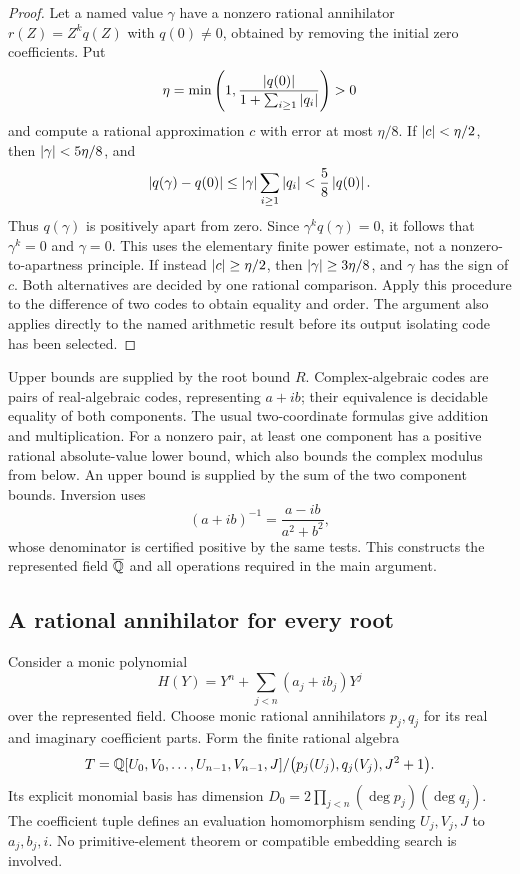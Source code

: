 \begin{proof}
Let a named value $\gamma$ have a nonzero rational annihilator
$r(Z)=Z^k q(Z)$ with $q(0)\ne0$, obtained by removing the initial zero
coefficients. Put
\[
 \eta=\min\left(1,
       \frac{\left|q(0)\right|}{1+\sum_{i\ge1}\left|q_i\right|}\right)>0
\]
and compute a rational approximation $c$ with error at most $\eta/8$.
If $\left|c\right|<\eta/2$, then $\left|\gamma\right|<5\eta/8$, and
\[
 \left|q(\gamma)-q(0)\right|
 \le\left|\gamma\right|\sum_{i\ge1}\left|q_i\right|
 <\frac58\left|q(0)\right|.
\]
Thus $q(\gamma)$ is positively apart from zero. Since
$\gamma^k q(\gamma)=0$, it follows that $\gamma^k=0$ and $\gamma=0$.
This uses the elementary finite power estimate, not a
nonzero-to-apartness principle. If instead $\left|c\right|\ge\eta/2$, then
$\left|\gamma\right|\ge3\eta/8$, and $\gamma$ has the sign of $c$.
Both alternatives are decided by one rational comparison.
Apply this procedure to the difference of two codes to obtain equality
and order. The argument also applies directly to the named arithmetic
result before its output isolating code has been selected.
\end{proof}

Upper bounds are supplied by the root bound $R$.
Complex-algebraic codes are pairs of real-algebraic codes, representing
$a+ib$; their equivalence is decidable equality of both components.
The usual two-coordinate formulas give addition and multiplication.
For a nonzero pair, at least one component has a positive rational
absolute-value lower bound, which also bounds the complex modulus from
below. An upper bound is supplied by the sum of the two component bounds.
Inversion uses
\[
 (a+ib)^{-1}=\frac{a-ib}{a^2+b^2},
\]
whose denominator is certified positive by the same tests.
This constructs the represented field $\overline{\mathbb Q}$ and all operations required
in the main argument.

\subsection{A rational annihilator for every root}

Consider a monic polynomial
\[
 H(Y)=Y^n+\sum_{j<n}(a_j+ib_j)Y^j
\]
over the represented field. Choose monic rational annihilators $p_j,q_j$
for its real and imaginary coefficient parts. Form the finite rational
algebra
\[
 T=\mathbb Q[U_0,V_0,\ldots,U_{n-1},V_{n-1},J]/
       \bigl(p_j(U_j),q_j(V_j),J^2+1\bigr).
\]
Its explicit monomial basis has dimension
$D_0=2\prod_{j<n}(\deg p_j)(\deg q_j)$.
The coefficient tuple defines an evaluation homomorphism sending
$U_j,V_j,J$ to $a_j,b_j,i$. No primitive-element theorem or compatible
embedding search is involved.

